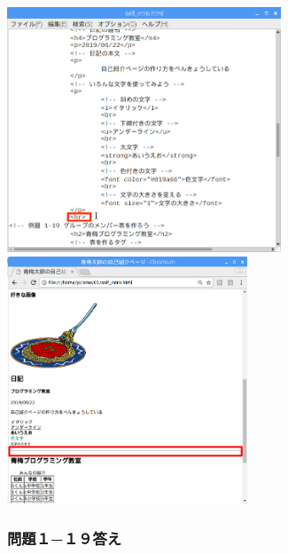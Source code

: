 \documentclass[a4paper,12pt]{jarticle}
\begin{document}
\centering
\includegraphics[width=8.186cm,height=7.304cm]{textbook-img237.png}
\includegraphics[width=7.163cm,height=7.373cm]{textbook-img238.png}
\flushleft

\bigskip


\bigskip

\clearpage\subsubsection{\bfseries
問題１−１９答え}



\centering
{}
\flushleft

\bigskip

\centering
{}
\flushleft
\end{document}
